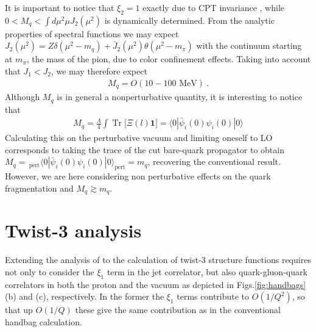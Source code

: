 \documentclass[preprintnumbers,floatfix,nofootinbib]{revtex4}
\newcommand{\todo}[1]{\marginpar{$\bullet$}\textbf{#1}}
\newcommand{\Tr}{\operatorname*{Tr}\nolimits} %
\newcommand{\mj}{M_q}
\begin{document}
It is important to notice that $\xi_2=1$ exactly due to CPT invariance \cite{Weinberg-book}, while $0 < M_q < \int d\mu^2 \mu J_2(\mu^2)$ is dynamically determined. From the analytic properties of spectral functions we may expect \cite{Accardi-Qiu)} $J_2(\mu^2) = Z \delta(\mu^2-m_q) + \bar J_2 (\mu^2) \theta (\mu^2-m_\pi)$ with the continuum starting at $m_\pi$, the mass of the pion, due to color confinement effects. Taking into account that $J_1 < J_2$, we may therefore expect 
\begin{align}
  \label{eq:mjet}
  \mj = O(10-100 \text{ MeV}) \ .
\end{align}
Although $\mj$ is in general a nonperturbative quantity, it is interesting to
notice that  
\begin{align}
  \label{eq:xi2_chiral_cond}
  \mj = \frac{\Lambda}{4} \int \Tr \big[ \Xi(l) \bm 1] 
   = \langle 0 | \bar \psi_i(0) \psi_i(0) | 0 \rangle
\end{align}
Calculating this on the perturbative vacuum and limiting oneself to LO
corresponds to taking the trace of the cut bare-quark propagator to obtain 
$\mj = \,_{\text{pert}} \langle 0
|  \bar \psi_i(0) \psi_i(0) | 0 \rangle_{\text{pert}}  = m_q$, recovering the
conventional result. However, we are here considering non perturbative effects
on the quark fragmentation and $\mj \gtrsim m_q$. 

\section{Twist-3 analysis}

Extending the analysis of \cite{Accardi-Qiu} to the calculation of twist-3
structure functions requires not only to consider the $\xi_1$ term in the jet
correlator, but also quark-gluon-quark correlators in both the proton and the
vacuum as depicted in Figs.\ref{fig:handbags}(b) and (c), respectively. 
In the former the $\xi_1$ terms contribute to $O(1/Q^2)$, so that up $O(1/Q)$
these give the same contribution as in the conventional handbag calculation.  
\end{document}
